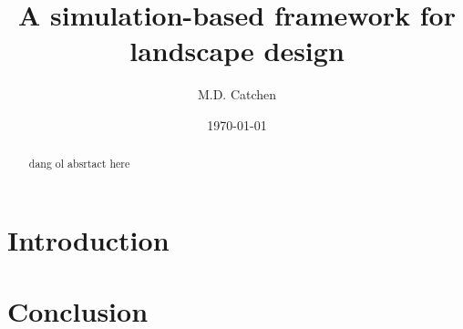 \documentclass[]{article}
\title{A simulation-based framework for landscape design \\}
\author[1]{M.D. Catchen}
\affil[1]{\small{Department of Biology, McGill University}}
\date{\today}
\begin{document}
\maketitle
\begin{abstract}

dang ol absrtact here

\end{abstract}
\clearpage
\tableofcontents
\clearpage
\section{Introduction}


\section{Conclusion}

\clearpage
{
\footnotesize

}
\end{document}
